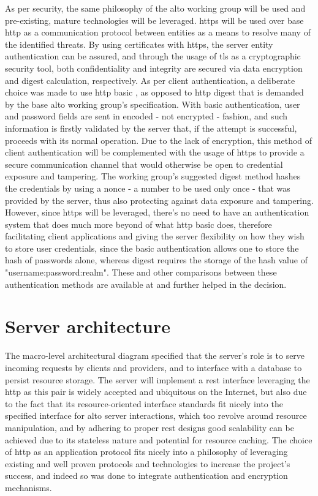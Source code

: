     As per security, the same philosophy of the \gls{alto} working group will be used and pre-existing, mature technologies will be leveraged.
    \gls{https} will be used over base \gls{http} as a communication protocol between entities as a means to resolve many of the identified threats.
    By using certificates with \gls{https}, the server entity authentication can be assured, and through the usage of \gls{tls} as a cryptographic security tool, both confidentiality and integrity are secured via data encryption and digest calculation, respectively.
    As per client authentication, a deliberate choice was made to use \gls{http} basic \cite{http-basic}, as opposed to \gls{http} digest \cite{http-digest} that is demanded by the base \gls{alto} working group's specification.
    With basic authentication, user and password fields are sent in encoded - not encrypted - fashion, and such information is firstly validated by the server that, if the attempt is successful, proceeds with its normal operation.
    Due to the lack of encryption, this method of client authentication will be complemented with the usage of \gls{https} to provide a secure communication channel that would otherwise be open to credential exposure and tampering.
    The working group's suggested digest method hashes the credentials by using a nonce - a number to be used only once - that was provided by the server, thus also protecting against data exposure and tampering.
    However, since \gls{https} will be leveraged, there's no need to have an authentication system that does much more beyond of what \gls{http} basic does, therefore facilitating client applications and giving the server flexibility on how they wish to store user credentials, since the basic authentication allows one to store the hash of passwords alone, whereas digest requires the storage of the hash value of "username:password:realm".
    These and other comparisons between these authentication methods are available at \cite{http-authentication} and further helped in the decision.


\section{Server architecture}

    \label{sec:implementation-server}

    The macro-level architectural diagram specified that the server's role is to serve incoming requests by clients and providers, and to interface with a database to persist resource storage.
    The server will implement a \gls{rest} interface leveraging the \gls{http} as this pair is widely accepted and ubiquitous on the Internet, but also due to the fact that its resource-oriented interface standards fit nicely into the specified interface for \gls{alto} server interactions, which too revolve around resource manipulation, and by adhering to proper \gls{rest} designs good scalability can be achieved due to its stateless nature and potential for resource caching.
    The choice of \gls{http} as an application protocol fits nicely into a philosophy of leveraging existing and well proven protocols and technologies to increase the project's success, and indeed so was done to integrate authentication and encryption mechanisms.

